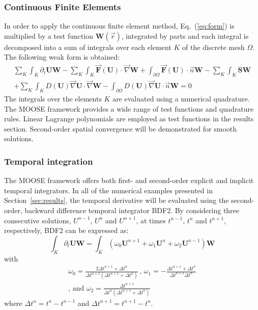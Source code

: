 \documentclass[preprint,10pt]{elsarticle}
\newcommand{\grad}{\vec{\nabla}}
\newcommand{\eqt}[1]{Eq.~(\ref{#1})}                     %
\newcommand{\sct}[1]{Section~\ref{#1}}                   %
\begin{document}
\subsubsection{Continuous Finite Elements} 
In order to apply the continuous finite element method, \eqt{eq:form} is multiplied by a test function $\mathbf W(\vec{r})$, integrated by parts and each integral is decomposed into a sum of integrals over each element $K$ of the discrete mesh $\Omega$. The following weak form is obtained:
\begin{multline}\label{eq:cfem}
\sum_K \int_{K} \partial_t \mathbf U \mathbf W - \sum_K \int_{K} \vec{\mathbf F}(\mathbf U) \cdot \grad \mathbf W + \int_{\partial \Omega} \vec{\mathbf F}(\mathbf U) \cdot \vec{n} \mathbf W - \sum_K \int_{K} \mathbf S \mathbf W  \\
+ \sum_K \int_{K} D(\mathbf U) \grad \mathbf U \cdot \grad \mathbf W 
- \int_{\partial \Omega} D(\mathbf U) \grad \mathbf U \cdot \vec{n} \mathbf W = 0
\end{multline}
The integrals over the elements $K$ are evaluated using a numerical quadrature. The MOOSE framework provides a wide range of test functions and quadrature rules. Linear Lagrange polynomials are employed as test functions in the results section. Second-order spatial convergence will be demonstrated for smooth solutions. 

\subsubsection{Temporal integration} 
The MOOSE framework offers both first- and second-order explicit and implicit temporal integrators. In all of the numerical examples presented in \sct{sec:results}, the temporal derivative  will be evaluated using the second-order, backward difference temporal integrator BDF2. By considering three consecutive solutions, $U^{n-1}$, $U^n$ and $U^{n+1}$, at times $t^{n-1}$, $t^n$ and $t^{n+1}$, respectively, BDF2 can be expressed as:
\begin{equation}
\label{eq:BDF2}
\int_{K} \partial_t \mathbf U \mathbf  W = \int_{K} \left( \omega_0 \mathbf U^{n+1}  + \omega_1 \mathbf U^n + \omega_2 \mathbf U^{n-1} \right) \mathbf W
\end{equation}
%
with
\begin{multline}
\omega_0 =\frac{2\Delta t^{n+1}+\Delta t^n}{\Delta t^{n+1} \left( \Delta t^{n+1}+\Delta t^n \right)} \,,\,
\omega_1 = -\frac{\Delta t^{n+1}+\Delta t^n}{\Delta t^{n+1} \Delta t^n}  \\
\text{, and } \omega_2 = \frac{\Delta t^{n+1}}{\Delta t^n \left( \Delta t^{n+1} + \Delta t^n \right)} \nonumber
\end{multline}
where $\Delta t^{n} = t^n-t^{n-1}$ and $\Delta t^{n+1} = t^{n+1}-t^{n}$.
\end{document}
